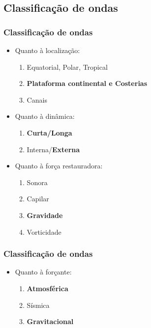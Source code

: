 \subsection{Classificação de ondas}
\begin{frame}
    \frametitle{Classificação de ondas}
    \small{
    \begin{itemize}[<+-| alert@+>]
        \item Quanto à localização:
            \begin{enumerate}[<+-| alert@+>]
                \item[] Equatorial, Polar, Tropical
                \item[] {\bf Plataforma continental e Costerias}
                \item[] Canais
            \end{enumerate}
        \item Quanto à dinâmica:
            \begin{enumerate}[<+-| alert@+>]
                \item[] {\bf Curta/Longa}
                \item[] Interna/{\bf Externa}
            \end{enumerate}
        \item Quanto à força restauradora:
            \begin{enumerate}[<+-| alert@+>]
                \item[] Sonora
                \item[] Capilar
                \item[] {\bf Gravidade}
                \item[] Vorticidade
            \end{enumerate}
    \end{itemize}
        }
\end{frame}

\begin{frame}
    \frametitle{Classificação de ondas}
    \small{
    \begin{itemize}[<+-| alert@+>]
        \item Quanto à forçante:
            \begin{enumerate}[<+-| alert@+>]
                \item[] {\bf Atmosférica}
                \item[] Sísmica
                \item[] {\bf Gravitacional}
            \end{enumerate}
    \end{itemize}
    }
\end{frame}

